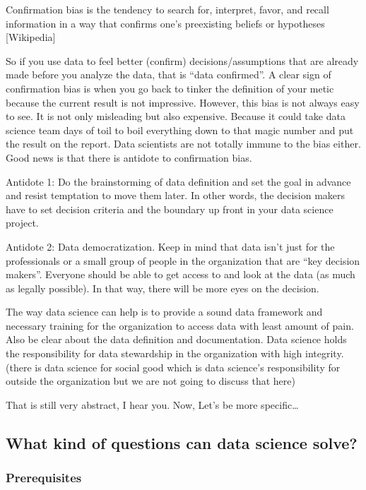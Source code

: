 \documentclass[12pt,]{krantz}
\renewenvironment{quote}{\begin{VF}}{\end{VF}}
\theoremstyle{definition}
\theoremstyle{definition}
\theoremstyle{definition}
\theoremstyle{remark}
\begin{document}
\begin{quote}
Confirmation bias is the tendency to search for, interpret, favor, and
recall information in a way that confirms one's preexisting beliefs or
hypotheses {[}Wikipedia{]}
\end{quote}

So if you use data to feel better (confirm) decisions/assumptions that
are already made before you analyze the data, that is ``data
confirmed''. A clear sign of confirmation bias is when you go back to
tinker the definition of your metic because the current result is not
impressive. However, this bias is not always easy to see. It is not only
misleading but also expensive. Because it could take data science team
days of toil to boil everything down to that magic number and put the
result on the report. Data scientists are not totally immune to the bias
either. Good news is that there is antidote to confirmation bias.

Antidote 1: Do the brainstorming of data definition and set the goal in
advance and resist temptation to move them later. In other words, the
decision makers have to set decision criteria and the boundary up front
in your data science project.

Antidote 2: Data democratization. Keep in mind that data isn't just for
the professionals or a small group of people in the organization that
are ``key decision makers''. Everyone should be able to get access to
and look at the data (as much as legally possible). In that way, there
will be more eyes on the decision.

The way data science can help is to provide a sound data framework and
necessary training for the organization to access data with least amount
of pain. Also be clear about the data definition and documentation. Data
science holds the responsibility for data stewardship in the
organization with high integrity. (there is data science for social good
which is data science's responsibility for outside the organization but
we are not going to discuss that here)

That is still very abstract, I hear you. Now, Let's be more
specific\ldots{}

\subsection{What kind of questions can data science
solve?}\label{what-kind-of-questions-can-data-science-solve}

\subsubsection{Prerequisites}\label{prerequisites}
\end{document}
